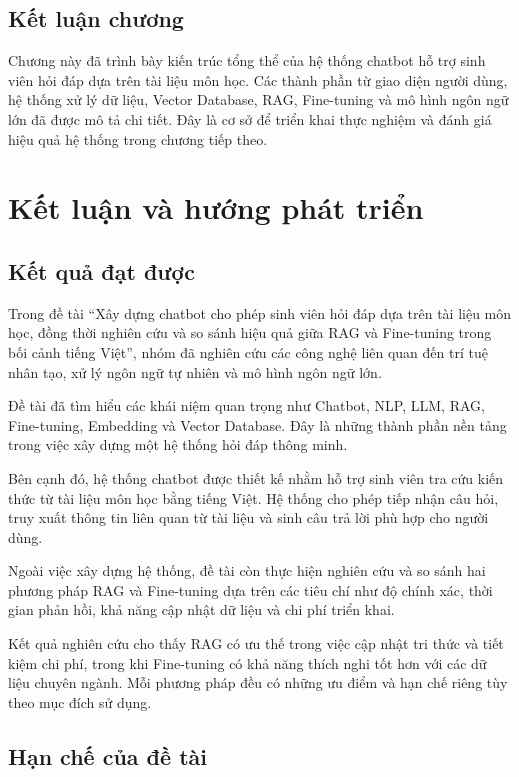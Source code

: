 \documentclass[12pt,a4paper]{report}
\begin{document}
	\section{Kết luận chương}
	
	Chương này đã trình bày kiến trúc tổng thể của hệ thống chatbot hỗ trợ sinh viên hỏi đáp dựa trên tài liệu môn học. Các thành phần từ giao diện người dùng, hệ thống xử lý dữ liệu, Vector Database, RAG, Fine-tuning và mô hình ngôn ngữ lớn đã được mô tả chi tiết. Đây là cơ sở để triển khai thực nghiệm và đánh giá hiệu quả hệ thống trong chương tiếp theo.
	
	
	\chapter{Kết luận và hướng phát triển}
	
	\section{Kết quả đạt được}
	
	Trong đề tài ``Xây dựng chatbot cho phép sinh viên hỏi đáp dựa trên tài liệu môn học, đồng thời nghiên cứu và so sánh hiệu quả giữa RAG và Fine-tuning trong bối cảnh tiếng Việt'', nhóm đã nghiên cứu các công nghệ liên quan đến trí tuệ nhân tạo, xử lý ngôn ngữ tự nhiên và mô hình ngôn ngữ lớn.
	
	Đề tài đã tìm hiểu các khái niệm quan trọng như Chatbot, NLP, LLM, RAG, Fine-tuning, Embedding và Vector Database. Đây là những thành phần nền tảng trong việc xây dựng một hệ thống hỏi đáp thông minh.
	
	Bên cạnh đó, hệ thống chatbot được thiết kế nhằm hỗ trợ sinh viên tra cứu kiến thức từ tài liệu môn học bằng tiếng Việt. Hệ thống cho phép tiếp nhận câu hỏi, truy xuất thông tin liên quan từ tài liệu và sinh câu trả lời phù hợp cho người dùng.
	
	Ngoài việc xây dựng hệ thống, đề tài còn thực hiện nghiên cứu và so sánh hai phương pháp RAG và Fine-tuning dựa trên các tiêu chí như độ chính xác, thời gian phản hồi, khả năng cập nhật dữ liệu và chi phí triển khai.
	
	Kết quả nghiên cứu cho thấy RAG có ưu thế trong việc cập nhật tri thức và tiết kiệm chi phí, trong khi Fine-tuning có khả năng thích nghi tốt hơn với các dữ liệu chuyên ngành. Mỗi phương pháp đều có những ưu điểm và hạn chế riêng tùy theo mục đích sử dụng.
	
	\section{Hạn chế của đề tài}
	
\end{document}
